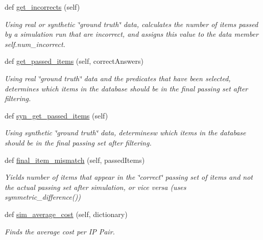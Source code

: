 \begin{DoxyCompactItemize}
def \mbox{\hyperlink{classdynamicfilterapp_1_1test__simulations_1_1_simulation_test_a9adfa8688f12473b0c394cd3b7237be0}{get\+\_\+incorrects}} (self)
\begin{DoxyCompactList}\small\item\em Using real or synthetic \char`\"{}ground truth\char`\"{} data, calculates the number of items passed by a simulation run that are incorrect, and assigns this value to the data member self.\+num\+\_\+incorrect. \end{DoxyCompactList}\item 
def \mbox{\hyperlink{classdynamicfilterapp_1_1test__simulations_1_1_simulation_test_a7c7a6eb7abd732121d6b150823fbd1d2}{get\+\_\+passed\+\_\+items}} (self, correct\+Answers)
\begin{DoxyCompactList}\small\item\em Using real \char`\"{}ground truth\char`\"{} data and the predicates that have been selected, determines which items in the database should be in the final passing set after filtering. \end{DoxyCompactList}\item 
def \mbox{\hyperlink{classdynamicfilterapp_1_1test__simulations_1_1_simulation_test_a33fcff5dca045189c9ed364d42956b29}{syn\+\_\+get\+\_\+passed\+\_\+items}} (self)
\begin{DoxyCompactList}\small\item\em Using synthetic \char`\"{}ground truth\char`\"{} data, determinesw which items in the database should be in the final passing set after filtering. \end{DoxyCompactList}\item 
def \mbox{\hyperlink{classdynamicfilterapp_1_1test__simulations_1_1_simulation_test_ae535f7d0761a00bc82b9fdcd19556403}{final\+\_\+item\+\_\+mismatch}} (self, passed\+Items)
\begin{DoxyCompactList}\small\item\em Yields number of items that appear in the \char`\"{}correct\char`\"{} passing set of items and not the actual passing set after simulation, or vice versa (uses symmetric\+\_\+difference()) \end{DoxyCompactList}\item 
def \mbox{\hyperlink{classdynamicfilterapp_1_1test__simulations_1_1_simulation_test_abf6e0246425a2b44f86854e6df6aa08a}{sim\+\_\+average\+\_\+cost}} (self, dictionary)
\begin{DoxyCompactList}\small\item\em Finds the average cost per IP Pair. \end{DoxyCompactList}\item 

\end{DoxyCompactItemize}
